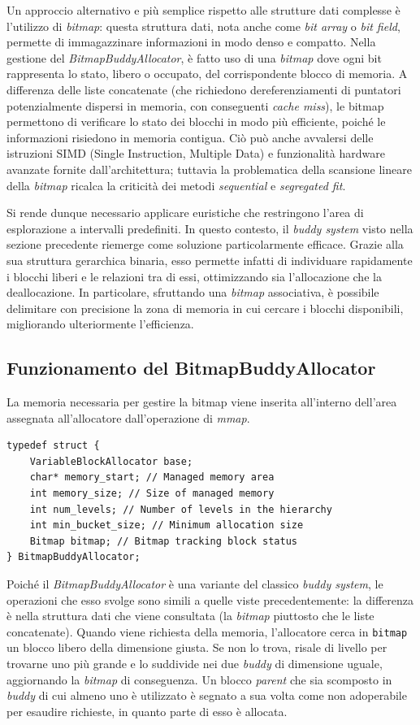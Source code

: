 Un approccio alternativo e più semplice rispetto alle strutture dati complesse è l’utilizzo di \textit{bitmap}: questa struttura dati, nota anche come \textit{bit array} o \textit{bit field}, permette di immagazzinare informazioni in modo denso e compatto.  Nella gestione del \textit{BitmapBuddyAllocator}, è fatto uso di una \textit{bitmap} dove ogni bit rappresenta lo stato, libero o occupato, del corrispondente blocco di memoria. A differenza delle liste concatenate (che richiedono dereferenziamenti di puntatori potenzialmente dispersi in memoria, con conseguenti \textit{cache miss}), le bitmap permettono di verificare lo stato dei blocchi in modo più efficiente, poiché le informazioni risiedono in memoria contigua. Ciò può anche avvalersi delle istruzioni SIMD (Single Instruction, Multiple Data) e funzionalità hardware avanzate fornite dall’architettura; tuttavia la problematica della scansione lineare della \textit{bitmap} ricalca la criticità dei metodi \textit{sequential} e \textit{segregated fit}.

Si rende dunque necessario applicare euristiche che restringono l’area di esplorazione a intervalli predefiniti. In questo contesto, il \textit{buddy system} visto nella sezione precedente riemerge come soluzione particolarmente efficace. Grazie alla sua struttura gerarchica binaria, esso permette infatti di individuare rapidamente i blocchi liberi e le relazioni tra di essi, ottimizzando sia l’allocazione che la deallocazione. In particolare, sfruttando una \textit{bitmap} associativa, è possibile delimitare con precisione la zona di memoria in cui cercare i blocchi disponibili, migliorando ulteriormente l’efficienza.

\subsection*{Funzionamento del BitmapBuddyAllocator}
La memoria necessaria per gestire la bitmap viene inserita all'interno dell'area assegnata all'allocatore dall'operazione di \textit{mmap}.
\begin{lstlisting}
typedef struct {
    VariableBlockAllocator base; 
    char* memory_start; // Managed memory area
    int memory_size; // Size of managed memory
    int num_levels; // Number of levels in the hierarchy
    int min_bucket_size; // Minimum allocation size
    Bitmap bitmap; // Bitmap tracking block status
} BitmapBuddyAllocator;
\end{lstlisting}

Poiché il \textit{BitmapBuddyAllocator} è una variante del classico \textit{buddy system}, le operazioni che esso svolge sono simili a quelle viste precedentemente: la differenza è nella struttura dati che viene consultata (la \textit{bitmap} piuttosto che le liste concatenate). Quando viene richiesta della memoria, l’allocatore cerca in \lstinline[]|bitmap| un blocco libero della dimensione giusta. Se non lo trova, risale di livello per trovarne uno più grande e lo suddivide nei due \textit{buddy} di dimensione uguale, aggiornando la \textit{bitmap} di conseguenza. Un blocco \textit{parent} che sia scomposto in \textit{buddy} di cui almeno uno è utilizzato è segnato a sua volta come non adoperabile per esaudire richieste, in quanto parte di esso è allocata.

